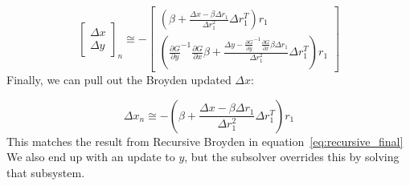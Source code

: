 \documentclass{article}
\begin{document}
\begin{equation}
  {
  \begin{bmatrix}
    \Delta x \\
    \Delta y
  \end{bmatrix}
  }_n \cong -
  \begin{bmatrix}
    (\beta + \frac{\Delta x - \beta \Delta r_{1}}{\Delta r_{1}^2 } \Delta r_{1}^T) r_1 \\
    ({\frac{\partial G}{\partial y}}^{-1} \frac{\partial G}{\partial x} \beta + \frac{\Delta y - {\frac{\partial G}{\partial y}}^{-1} \frac{\partial G}{\partial x} \beta \Delta r_{1}}{\Delta r_{1}^2 } \Delta r_{1}^T) r_1
  \end{bmatrix}
\end{equation}
Finally, we can pull out the Broyden updated $\Delta x$:

\begin{equation}
  \Delta x_n \cong  -(\beta + \frac{\Delta x - \beta \Delta r_{1}}{\Delta r_{1}^2 } \Delta r_{1}^T )r_{1} \label{eq:hier_final}
\end{equation}
This matches the result from Recursive Broyden in equation~\eqref{eq:recursive_final} We also end up with an update to $y$, but the subsolver overrides this by solving that
subsystem.
\end{document}
